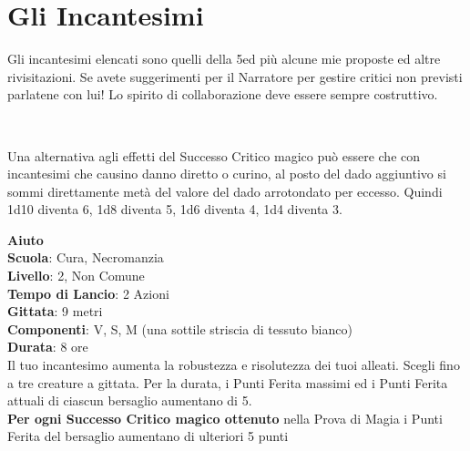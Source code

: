 
\section{Gli Incantesimi}

\begin{multicols}{2}

\medskip

\begin{changemargin}{0.3cm}{0.3cm}\begin{tcolorbox}[title = Più effetti speciali!]
Gli incantesimi elencati sono quelli della 5ed più alcune mie proposte ed altre rivisitazioni. Se avete suggerimenti per il Narratore per gestire critici non previsti parlatene con lui! Lo spirito di collaborazione deve essere sempre costruttivo.
\end{tcolorbox}\end{changemargin}

~

\begin{changemargin}{0.3cm}{0.3cm}\begin{narratore}
Una alternativa agli effetti del Successo Critico magico può essere che con incantesimi che causino danno diretto o curino, al posto del dado aggiuntivo si sommi direttamente metà del valore del dado arrotondato per eccesso. Quindi 1d10 diventa 6, 1d8 diventa 5, 1d6 diventa 4, 1d4 diventa 3.
\end{narratore}\end{changemargin}


\medskip\textbf{Aiuto}\\
\textbf{Scuola}: Cura, Necromanzia\\
\textbf{Livello}: 2, Non Comune\\
\textbf{Tempo di Lancio}: 2 Azioni\\
\textbf{Gittata}: 9 metri\\
\textbf{Componenti}: V, S, M (una sottile striscia di tessuto bianco)\\
\textbf{Durata}: 8 ore\\
Il tuo incantesimo aumenta la robustezza e risolutezza dei tuoi alleati. Scegli fino a tre creature a gittata. Per la durata, i Punti Ferita massimi ed i Punti Ferita attuali di ciascun bersaglio aumentano di 5.\\
\textbf{Per ogni Successo Critico magico ottenuto} nella Prova di Magia i Punti Ferita del bersaglio aumentano di ulteriori 5 punti


\end{multicols}
